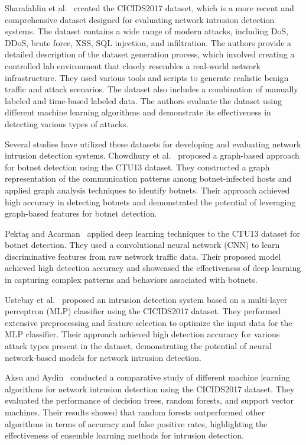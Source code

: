 Sharafaldin et al.~\cite{sharafaldin2018toward} created the CICIDS2017 dataset, which is a more recent and comprehensive dataset designed for evaluating network intrusion detection systems. The dataset contains a wide range of modern attacks, including DoS, DDoS, brute force, XSS, SQL injection, and infiltration. The authors provide a detailed description of the dataset generation process, which involved creating a controlled lab environment that closely resembles a real-world network infrastructure. They used various tools and scripts to generate realistic benign traffic and attack scenarios. The dataset also includes a combination of manually labeled and time-based labeled data. The authors evaluate the dataset using different machine learning algorithms and demonstrate its effectiveness in detecting various types of attacks.

Several studies have utilized these datasets for developing and evaluating network intrusion detection systems. Chowdhury et al.~\cite{chowdhury2017botnet} proposed a graph-based approach for botnet detection using the CTU13 dataset. They constructed a graph representation of the communication patterns among botnet-infected hosts and applied graph analysis techniques to identify botnets. Their approach achieved high accuracy in detecting botnets and demonstrated the potential of leveraging graph-based features for botnet detection.

Pektaş and Acarman~\cite{pektacs2019deep} applied deep learning techniques to the CTU13 dataset for botnet detection. They used a convolutional neural network (CNN) to learn discriminative features from raw network traffic data. Their proposed model achieved high detection accuracy and showcased the effectiveness of deep learning in capturing complex patterns and behaviors associated with botnets.

Ustebay et al.~\cite{ustebay2018intrusion} proposed an intrusion detection system based on a multi-layer perceptron (MLP) classifier using the CICIDS2017 dataset. They performed extensive preprocessing and feature selection to optimize the input data for the MLP classifier. Their approach achieved high detection accuracy for various attack types present in the dataset, demonstrating the potential of neural network-based models for network intrusion detection.

Aksu and Aydin~\cite{aksu2018detecting} conducted a comparative study of different machine learning algorithms for network intrusion detection using the CICIDS2017 dataset. They evaluated the performance of decision trees, random forests, and support vector machines. Their results showed that random forests outperformed other algorithms in terms of accuracy and false positive rates, highlighting the effectiveness of ensemble learning methods for intrusion detection.

